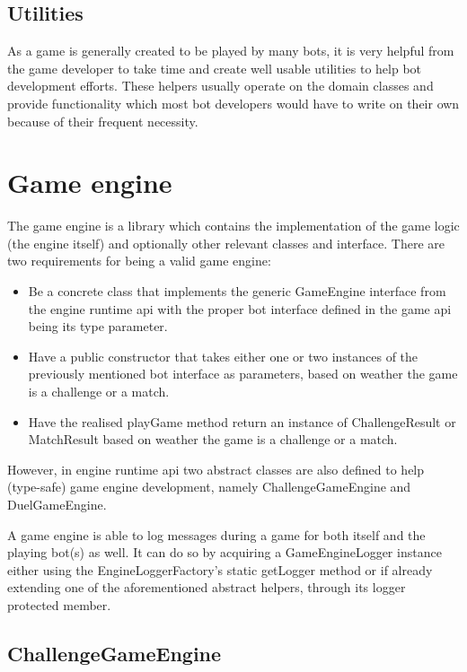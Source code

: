 		\subsection{Utilities}
		
		As a game is generally created to be played by many bots, it is very helpful from the game developer to take time and create well usable utilities to help bot development efforts. These helpers usually operate on the domain classes and provide functionality which most bot developers would have to write on their own because of their frequent necessity.

	\section{Game engine}
	
	The game engine is a library which contains the implementation of the game logic (the engine itself) and optionally other relevant classes and interface. There are two requirements for being a valid game engine:
	
	\begin{itemize}
		\item Be a concrete class that implements the generic GameEngine interface from the engine runtime api
		with the proper bot interface defined in the game api being its type parameter.
		
		\item Have a public constructor that takes either one or two instances of the previously mentioned bot 
		interface as parameters, based on weather the game is a challenge or a match.
		
		\item Have the realised playGame method return an instance of ChallengeResult or MatchResult based on 
		weather the game is a challenge or a match.
	\end{itemize} 
	
	However, in engine runtime api two abstract classes are also defined to help (type-safe) game engine development, namely ChallengeGameEngine and DuelGameEngine.
	
	A game engine is able to log messages during a game for both itself and the playing bot(s) as well. It can do so by acquiring a GameEngineLogger instance either using the EngineLoggerFactory's static getLogger method or if already extending one of the aforementioned abstract helpers, through its logger protected member.  
	
		\subsection{ChallengeGameEngine}
		
